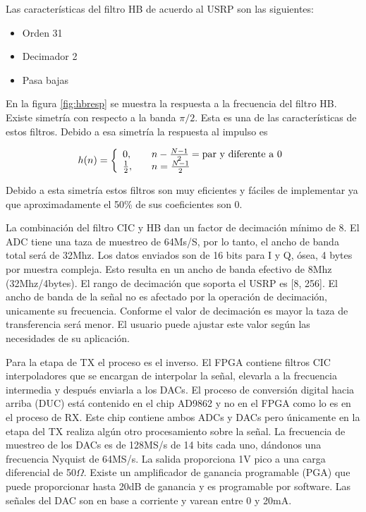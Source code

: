 Las caracter\'isticas del filtro HB de acuerdo al USRP son las siguientes:

\begin{itemize}
  \item Orden 31
  \item Decimador 2
  \item Pasa bajas
\end{itemize}

En la figura \ref{fig:hbresp} se muestra la respuesta a la frecuencia del filtro HB.
Existe simetr\'ia con respecto a la banda $\pi /2$. Esta es una de las
caracter\'isticas de estos filtros. Debido a esa simetr\'ia la respuesta al
impulso es

\begin{equation}
h(n)=\left\{
\begin{array}{l l}
0, & \quad n-\frac{N-1}{2}=\text{par y diferente a 0}\\
\frac{1}{2}, & \quad n=\frac{N-1}{2}
\end{array}\right.
\end{equation}

Debido a esta simetr\'ia estos filtros son muy eficientes y f\'aciles de
implementar ya que aproximadamente el 50\% de sus coeficientes son 0.

La combinaci\'on del filtro CIC y HB dan un factor de decimaci\'on m\'inimo de
8. El ADC tiene una taza de muestreo de 64Ms/S, por lo tanto, el ancho de banda
total ser\'a de 32Mhz. Los datos enviados son de 16 bits para I y Q, \'osea, 4
bytes por muestra compleja. Esto resulta en un ancho de banda efectivo de 8Mhz
(32Mhz/4bytes). El rango de decimaci\'on que soporta el USRP es [8, 256]. El ancho de banda de la se\~nal no es afectado por la
operaci\'on de decimaci\'on, unicamente su frecuencia. Conforme el valor de decimaci\'on es mayor la taza de transferencia ser\'a
menor. El usuario puede ajustar este valor seg\'un las necesidades de su aplicaci\'on.

Para la etapa de TX el proceso es el inverso. El FPGA contiene filtros CIC interpoladores que se
encargan de interpolar la se\~nal, elevarla a la frecuencia intermedia y despu\'es
enviarla a los DACs. El proceso de conversi\'on digital hacia arriba (DUC)
est\'a contenido en el chip AD9862 y no en el FPGA como lo es en el proceso de
RX. Este chip contiene ambos ADCs y DACs pero \'unicamente en la etapa del TX
realiza alg\'un otro procesamiento sobre la se\~nal. La frecuencia de muestreo
de los DACs es de 128MS/s de 14 bits cada uno, d\'andonos una frecuencia Nyquist
de 64MS/s. La salida proporciona 1V pico a una carga diferencial de 50$\Omega$.
Existe un amplificador de ganancia programable (PGA) que puede proporcionar
hasta 20dB de ganancia y es programable por software. Las se\~nales del DAC son
en base a corriente y varean entre 0 y 20mA.

